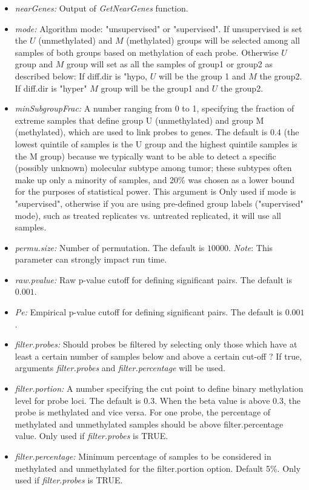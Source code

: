 \begin{itemize}
\item \textit{nearGenes:} Output of \textit{GetNearGenes} function.
\item  \textit{mode:} Algorithm mode: "unsupervised" or "supervised". If unsupervised is set
the $U$ (unmethylated) and $M$ (methylated) groups will be selected
among all samples of both groups based on methylation of each probe.
Otherwise $U$ group and $M$ group will set as all the samples of group1 or group2 as described below:
If diff.dir is "hypo, $U$ will be the group 1 and $M$ the group2.
If diff.dir is "hyper" $M$ group will be the group1 and $U$ the group2.
\item \textit{minSubgroupFrac:} A number ranging from 0 to 1, specifying the fraction of extreme  samples that define group U (unmethylated) and group M (methylated), which are used to link probes to genes. The default is 0.4 (the lowest quintile of samples is the U group and the highest quintile samples is the M group) because we typically want to be able to detect a specific (possibly unknown) molecular subtype among tumor; these subtypes often make up only a minority of samples, and 20\% was chosen as a lower bound for the purposes of statistical power. This argument is Only used if mode is "supervised", otherwise if you are using pre-defined group labels ("supervised" mode), such as treated replicates vs. untreated replicated, it will use all samples.
\item  \textit{permu.size:} Number of permutation. The default is $10000$. \textit{Note}: This parameter can strongly impact run time.
\item \textit{raw.pvalue:} Raw p-value cutoff for defining significant pairs. The default is $0.001$.
\item \textit{Pe:} Empirical p-value cutoff for defining significant pairs. The default is $0.001$.
\item \textit{filter.probes:} Should probes be filtered  by selecting only those which have at least a certain number of samples below and above a certain cut-off ? If true, arguments \textit{filter.probes} and \textit{filter.percentage} will be used.
\item  \textit{filter.portion:}	A number specifying the cut point to define binary methylation level for probe loci. The default is 0.3. When the beta value is above 0.3, the probe is methylated and vice versa. For one probe, the percentage of methylated and unmethylated samples should be above filter.percentage value. Only used if \textit{filter.probes} is TRUE.
\item  \textit{filter.percentage:}	Minimum percentage of samples to be considered in methylated and unmethylated for the filter.portion option. Default 5\%. Only used if \textit{filter.probes} is TRUE.
\end{itemize}


